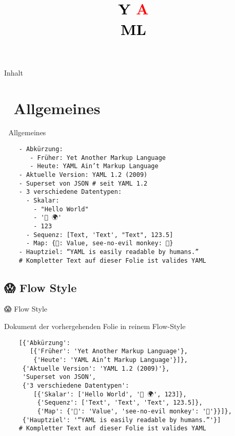 \documentclass{beamer}
\title{\vspace{2cm}\\
       \hspace{-3mm}\textbf{\textcolor{black}{Y}
       \hspace{-3.6mm}\textcolor{red}{A}\\[-10pt]
       \hspace{+3mm}\textcolor{black}{ML}}}
\date{\textit{\Subject}}
\begin{document}
{
  \begin{frame}[plain]
      \titlepage
  \end{frame}
}

\begin{frame}{Inhalt}
    \tableofcontents
\end{frame}

\section{🐪 Allgemeines}

\begin{frame}[fragile]{🐪 Allgemeines}
  \begin{verbatim}
    - Abkürzung:
       - Früher: Yet Another Markup Language
       - Heute: YAML Ain’t Markup Language
    - Aktuelle Version: YAML 1.2 (2009)
    - Superset von JSON # seit YAML 1.2
    - 3 verschiedene Datentypen:
      - Skalar:
        - "Hello World"
        - '👋 🌍'
        - 123
      - Sequenz: [Text, 'Text', "Text", 123.5]
      - Map: {🔑: Value, see-no-evil monkey: 🙈}
    - Hauptziel: “YAML is easily readable by humans.”
    # Kompletter Text auf dieser Folie ist valides YAML
  \end{verbatim}
\end{frame}

\subsection{😱 Flow Style}

\begin{frame}[fragile]{😱 Flow Style}
  \begin{block}{Dokument der vorhergehenden Folie in reinem Flow-Style}
    \begin{verbatim}
    [{'Abkürzung':
       [{'Früher': 'Yet Another Markup Language'},
        {'Heute': 'YAML Ain’t Markup Language'}]},
     {'Aktuelle Version': 'YAML 1.2 (2009)'},
     'Superset von JSON',
     {'3 verschiedene Datentypen':
        [{'Skalar': ['Hello World', '👋 🌍', 123]},
         {'Sequenz': ['Text', 'Text', 'Text', 123.5]},
         {'Map': {'🔑': 'Value', 'see-no-evil monkey': '🙈'}}]},
     {'Hauptziel': '“YAML is easily readable by humans.”'}]
    # Kompletter Text auf dieser Folie ist valides YAML
    \end{verbatim}
  \end{block}
\end{frame}
\end{document}
